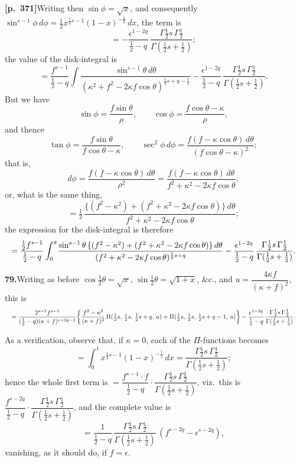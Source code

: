 \documentclass[11pt]{article}
\begin{document}
\bigskip

\noindent\textbf{[p.~371]}\quad Writing then $\sin\phi=\sqrt{x}$, and consequently $\sin^{s-1}\phi\,d\phi=\tfrac{1}{2}x^{\frac{1}{2}s-1}(1-x)^{-\frac{1}{2}}\,dx$, the term is
\[
= -\frac{\epsilon^{1-2q}}{\tfrac{1}{2}-q}\,\frac{\Gamma\tfrac{1}{2}s\,\Gamma\tfrac{1}{2}}{\Gamma(\tfrac{1}{2}s+\tfrac{1}{2})};
\]
the value of the disk-integral is
\[
= \frac{f^{s-1}}{\tfrac{1}{2}-q}\int\!\frac{\sin^{s-1}\theta\,d\theta}{(\kappa^{2}+f^{2}-2\kappa f\cos\theta)^{\frac{1}{2}s+q-\frac{1}{2}}} - \frac{\epsilon^{1-2q}}{\tfrac{1}{2}-q}\,\frac{\Gamma\tfrac{1}{2}s\,\Gamma\tfrac{1}{2}}{\Gamma(\tfrac{1}{2}s+\tfrac{1}{2})}.
\]
But we have
\[
\sin\phi = \frac{f\sin\theta}{\rho},\qquad \cos\phi = \frac{f\cos\theta-\kappa}{\rho},
\]
and thence
\[
\tan\phi = \frac{f\sin\theta}{f\cos\theta-\kappa},\qquad \sec^{2}\phi\,d\phi = \frac{f(f-\kappa\cos\theta)\,d\theta}{(f\cos\theta-\kappa)^{2}};
\]
that is,
\[
d\phi = \frac{f(f-\kappa\cos\theta)\,d\theta}{\rho^{2}} = \frac{f(f-\kappa\cos\theta)\,d\theta}{f^{2}+\kappa^{2}-2\kappa f\cos\theta},
\]
or, what is the same thing,
\[
= \tfrac{1}{2}\,\frac{\{(f^{2}-\kappa^{2}) + (f^{2}+\kappa^{2}-2\kappa f\cos\theta)\}\,d\theta}{f^{2}+\kappa^{2}-2\kappa f\cos\theta};
\]
the expression for the disk-integral is therefore
\[
\resizebox{\textwidth}{!}{$\displaystyle
= \frac{\tfrac{1}{2}f^{s-1}}{\tfrac{1}{2}-q}\int_{0}^{\pi}\!\frac{\sin^{s-1}\theta\,\{(f^{2}-\kappa^{2})+(f^{2}+\kappa^{2}-2\kappa f\cos\theta)\}\,d\theta}{(f^{2}+\kappa^{2}-2\kappa f\cos\theta)^{\frac{1}{2}s+q}} - \frac{\epsilon^{1-2q}}{\tfrac{1}{2}-q}\,\frac{\Gamma\tfrac{1}{2}s\,\Gamma\tfrac{1}{2}}{\Gamma(\tfrac{1}{2}s+\tfrac{1}{2})}.$}
\]

\bigskip

\noindent\textbf{79.}\quad Writing as before $\cos\tfrac{1}{2}\theta=\sqrt{x}$, $\sin\tfrac{1}{2}\theta=\sqrt{1+x}$, \&c., and $u=\dfrac{4\kappa f}{(\kappa+f)^{2}}$, this is
\[
\resizebox{\textwidth}{!}{$\displaystyle
= \frac{2^{s-1}f^{s-1}}{(\tfrac{1}{2}-q)(\kappa+f)^{s+2q-1}}\!\left\{\frac{f^{2}-\kappa^{2}}{(\kappa+f)^{2}}\,\Pi(\tfrac{1}{2}s,\,\tfrac{1}{2}s,\,\tfrac{1}{2}s+q,\,u) + \Pi(\tfrac{1}{2}s,\,\tfrac{1}{2}s,\,\tfrac{1}{2}s+q-1,\,u)\right\} - \frac{\epsilon^{1-2q}}{\tfrac{1}{2}-q}\,\frac{\Gamma\tfrac{1}{2}s\,\Gamma\tfrac{1}{2}}{\Gamma(\tfrac{1}{2}s+\tfrac{1}{2})}.$}
\]

As a verification, observe that, if $\kappa=0$, each of the $\Pi$-functions becomes
\[
= \int_{0}^{1} x^{\frac{1}{2}s-1}(1-x)^{-\frac{1}{2}}\,dx = \frac{\Gamma\tfrac{1}{2}s\,\Gamma\tfrac{1}{2}}{\Gamma(\tfrac{1}{2}s+\tfrac{1}{2})};
\]
hence the whole first term is $=\dfrac{f^{s-1}\cdot f}{\tfrac{1}{2}-q}\cdot\dfrac{\Gamma\tfrac{1}{2}s\,\Gamma\tfrac{1}{2}}{\Gamma(\tfrac{1}{2}s+\tfrac{1}{2})}$, viz.\ this is $\dfrac{f^{s-2q}}{\tfrac{1}{2}-q}\cdot\dfrac{\Gamma\tfrac{1}{2}s\,\Gamma\tfrac{1}{2}}{\Gamma(\tfrac{1}{2}s+\tfrac{1}{2})}$, and the complete value is
\[
= \frac{1}{\tfrac{1}{2}-q}\,\frac{\Gamma\tfrac{1}{2}s\,\Gamma\tfrac{1}{2}}{\Gamma(\tfrac{1}{2}s+\tfrac{1}{2})}\,(f^{s-2q}-\epsilon^{s-2q}),
\]
vanishing, as it should do, if $f=\epsilon$.
\end{document}
